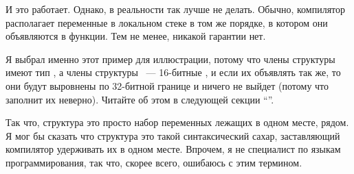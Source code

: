 И это работает. Однако, в реальности так лучше не делать. Обычно, компилятор располагает переменные в локальном
стеке в том же порядке, в котором они объявляются в функции. Тем не менее, никакой гарантии нет.

Я выбрал именно этот пример для иллюстрации, потому что члены структуры имеют тип \Tint, а члены структуры
 ~--- 16-битные , и если их объявлять так же, то они будут выровнены по 32-битной границе 
и ничего не выйдет (потому что  заполнит их неверно). Читайте об этом в следующей секции
``\StructurePackingSectionName''.

Так что, структура это просто набор переменных лежащих в одном месте, рядом. Я мог бы сказать что структура
это такой синтаксический сахар, заставляющий компилятор удерживать их в одном месте. Впрочем, я не специалист
по языкам программирования, так что, скорее всего, ошибаюсь с этим термином.

